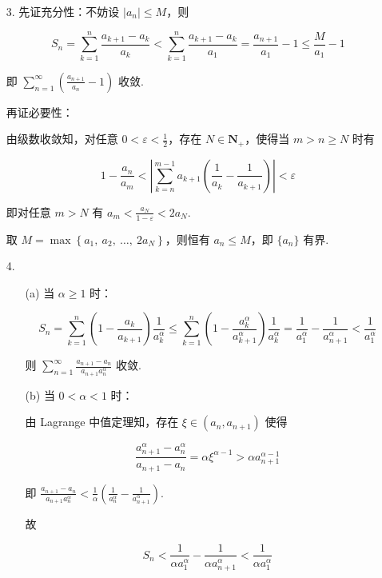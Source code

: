 \documentclass[oneside]{ctexbook} %
\begin{document}
\begin{enumerate}
    \item[3.]
    先证充分性：不妨设 $|a_n| \leqslant M$，则
    
    $$
    \displaystyle S_n = \sum_{k=1}^n \frac{a_{k+1} - a_k}{a_k} < \sum_{k=1}^n \frac{a_{k+1} - a_k}{a_1} = \frac{a_{n+1}}{a_1} - 1 \leqslant \frac M {a_1} - 1
    $$

    即 $\displaystyle \sum_{n=1}^{\infty} \left( \frac{a_{n+1}}{a_n} - 1 \right)$ 收敛.

    再证必要性：

    由级数收敛知，对任意 $0 < \varepsilon < \frac 1 2$，存在 $N \in \mathbf N_+$，使得当 $m > n \geqslant N$ 时有

    $$
    1 - \frac{a_n}{a_{m}} < \left| \sum_{k=n}^{m-1} a_{k+1} \left( \frac 1 {a_k} - \frac 1 {a_{k+1}} \right) \right| < \varepsilon
    $$

    即对任意 $m > N$ 有 $a_m < \frac{a_N}{1 - \varepsilon} < 2a_N$.
    
    取 $M = \max\left\{ a_1,\ a_2,\ \ldots,\ 2a_N \right\}$，则恒有 $a_n \leqslant M$，即 $\{ a_n \}$ 有界.
    \item[4.]
    \begin{enumerate}
        \item[(a)]
        当 $\alpha \geqslant 1$ 时：

        $$
        S_n = \sum_{k=1}^n \left( 1 - \frac{a_k}{a_{k+1}} \right) \frac 1 {a_k^{\alpha}} \leqslant \sum_{k=1}^n \left( 1 - \frac{a_k^{\alpha}}{a_{k+1}^{\alpha}} \right) \frac 1 {a_k^{\alpha}} = \frac 1 {a_1^{\alpha}} - \frac 1 {a_{n+1}^{\alpha}} < \frac 1 {a_1^{\alpha}}
        $$

        则 $\displaystyle \sum_{n=1}^{\infty} \frac{a_{n+1} - a_n}{a_{n+1} a_n^{\alpha}}$ 收敛.
        \item[(b)]
        当 $0 < \alpha < 1$ 时：

        由 Lagrange 中值定理知，存在 $\xi \in (a_n, a_{n+1})$ 使得

        $$
        \frac{a_{n+1}^{\alpha} - a_n^{\alpha}}{a_{n+1} - a_n} = \alpha \xi^{\alpha - 1} > \alpha a_{n+1}^{\alpha - 1}
        $$

        即 $\displaystyle \frac{a_{n+1} - a_n}{a_{n+1} a_n^{\alpha}} < \frac 1 {\alpha} \left( \frac 1 {a_n^{\alpha}} - \frac 1 {a_{n+1}^{\alpha}} \right)$.

        故

        $$
        S_n < \frac 1 {\alpha a_1^{\alpha}}  - \frac 1 {\alpha a_{n+1}^{\alpha}} < \frac 1 {\alpha a_1^{\alpha}}
        $$


\end{enumerate}
\end{enumerate}
\end{document}

